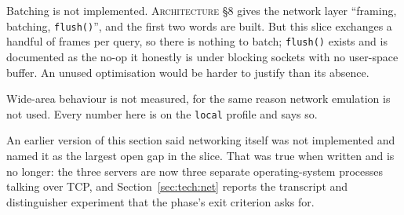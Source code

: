 Batching is not implemented. \textsc{Architecture} \S8 gives the network layer
``framing, batching, \texttt{flush()}'', and the first two words are built. But
this slice exchanges a handful of frames per query, so there is nothing to
batch; \texttt{flush()} exists and is documented as the no-op it honestly is
under blocking sockets with no user-space buffer. An unused optimisation would
be harder to justify than its absence.

Wide-area behaviour is not measured, for the same reason network emulation is
not used. Every number here is on the \texttt{local} profile and says so.

\medskip

\noindent
An earlier version of this section said networking itself was not implemented
and named it as the largest open gap in the slice. That was true when written
and is no longer: the three servers are now three separate operating-system
processes talking over TCP, and Section~\ref{sec:tech:net} reports the
transcript and distinguisher experiment that the phase's exit criterion asks
for.
